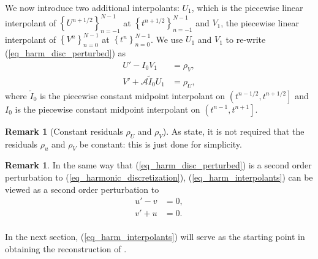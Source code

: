 \documentclass[12pt,a4paper]{article}
\numberwithin{equation}{section}
\theoremstyle{definition}
\newcommand{\qpb}[1]{\left(#1\right]}
\newcommand{\bracegs}[1]{\left\lbrace#1\right\rbrace}
\newtheorem{Rem}[subsection]{Remark}
\begin{document}
We now introduce two additional interpolants: $U_1$, which is the piecewise linear interpolant of $\bracegs{U^{n+1/2}}_{n=-1}^{N-1}$  at $\bracegs{t^{n+1/2}}_{n=-1}^{N-1}$ and $V_1$, the piecewise linear interpolant of $\bracegs{V^{n}}_{n=0}^{N-1}$ at $\bracegs{t^{n}}_{n=0}^{N-1}$. We use $U_1$ and $V_1$ to re-write (\ref{eq_harm_disc_perturbed}) as
\begin{equation}\label{eq_harm_interpolants}
\begin{aligned}
U'-I_0V_1&=\rho_V,\\
V'+ \mathcal{A}\tilde{I}_0U_1&=\rho_U,
\end{aligned}
\end{equation}
where $\tilde{I}_0$ is the piecewise constant midpoint interpolant on $\qpb{t^{n-1/2}, t^{n+1/2}}$ and ${I}_0$ is the piecewise constant midpoint interpolant on $\qpb{t^{n-1}, t^{n+1}}$. 
\begin{Rem}[Constant residuals $\rho_U$ and $\rho_V$]
As \cite{georgoulis2016posteriori} state,  it is not required that the  residuals $\rho_u$ and $\rho_V$ be constant: this is just done for simplicity.
\end{Rem}

 
\begin{Rem}\label{Rem_opt_perturbation_cont}
In the same way that (\ref{eq_harm_disc_perturbed}) is a second order perturbation to (\ref{eq_harmonic_discretization}), (\ref{eq_harm_interpolants}) can be viewed as a second order perturbation to
\begin{equation}\label{eq_harmonic_perturbed}
\begin{aligned}
u'- v &= 0,\\
v' +u &= 0.\\
\end{aligned}
\end{equation}
\end{Rem}
In the next section,  (\ref{eq_harm_interpolants}) will serve as the starting point in obtaining the reconstruction of \cite{georgoulis2016posteriori}.
\end{document}
